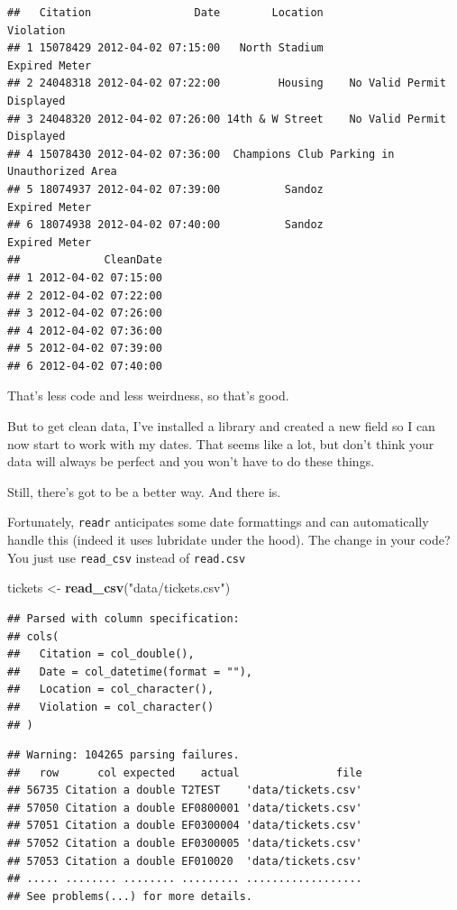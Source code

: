\documentclass[]{book}
\newenvironment{Shaded}{\begin{snugshade}}{\end{snugshade}}
\newcommand{\KeywordTok}[1]{\textcolor[rgb]{0.13,0.29,0.53}{\textbf{#1}}}
\newcommand{\NormalTok}[1]{#1}
\newcommand{\StringTok}[1]{\textcolor[rgb]{0.31,0.60,0.02}{#1}}
\begin{document}
\begin{verbatim}
##   Citation                Date        Location                    Violation
## 1 15078429 2012-04-02 07:15:00   North Stadium                Expired Meter
## 2 24048318 2012-04-02 07:22:00         Housing    No Valid Permit Displayed
## 3 24048320 2012-04-02 07:26:00 14th & W Street    No Valid Permit Displayed
## 4 15078430 2012-04-02 07:36:00  Champions Club Parking in Unauthorized Area
## 5 18074937 2012-04-02 07:39:00          Sandoz                Expired Meter
## 6 18074938 2012-04-02 07:40:00          Sandoz                Expired Meter
##             CleanDate
## 1 2012-04-02 07:15:00
## 2 2012-04-02 07:22:00
## 3 2012-04-02 07:26:00
## 4 2012-04-02 07:36:00
## 5 2012-04-02 07:39:00
## 6 2012-04-02 07:40:00
\end{verbatim}

That's less code and less weirdness, so that's good.

But to get clean data, I've installed a library and created a new field so I can now start to work with my dates. That seems like a lot, but don't think your data will always be perfect and you won't have to do these things.

Still, there's got to be a better way. And there is.

Fortunately, \texttt{readr} anticipates some date formattings and can automatically handle this (indeed it uses lubridate under the hood). The change in your code? You just use \texttt{read\_csv} instead of \texttt{read.csv}

\begin{Shaded}
\begin{Highlighting}[]
\NormalTok{tickets <-}\StringTok{ }\KeywordTok{read_csv}\NormalTok{(}\StringTok{"data/tickets.csv"}\NormalTok{)}
\end{Highlighting}
\end{Shaded}

\begin{verbatim}
## Parsed with column specification:
## cols(
##   Citation = col_double(),
##   Date = col_datetime(format = ""),
##   Location = col_character(),
##   Violation = col_character()
## )
\end{verbatim}

\begin{verbatim}
## Warning: 104265 parsing failures.
##   row      col expected    actual               file
## 56735 Citation a double T2TEST    'data/tickets.csv'
## 57050 Citation a double EF0800001 'data/tickets.csv'
## 57051 Citation a double EF0300004 'data/tickets.csv'
## 57052 Citation a double EF0300005 'data/tickets.csv'
## 57053 Citation a double EF010020  'data/tickets.csv'
## ..... ........ ........ ......... ..................
## See problems(...) for more details.
\end{verbatim}
\end{document}
